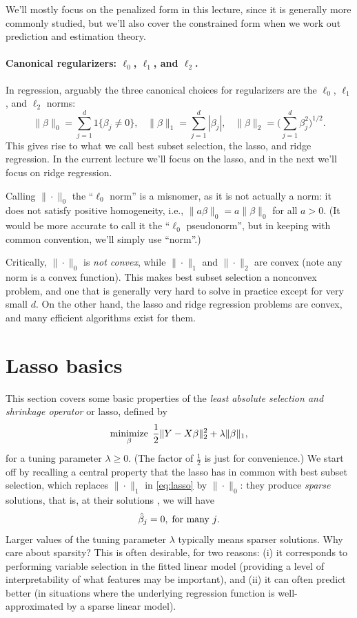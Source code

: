 \documentclass{article}
\begin{document}
We'll mostly focus on the penalized form in this lecture, since it is generally
more commonly studied, but we'll also cover the constrained form when we work
out prediction and estimation theory. 

\paragraph{Canonical regularizers: $\ell_0$, $\ell_1$, and $\ell_2$.}

In regression, arguably the three canonical choices for regularizers are the
$\ell_0$, $\ell_1$, and $\ell_2$ norms: 
\[
\|\beta\|_0 = \sum_{j=1}^d 1\{\beta_j \not= 0\}, \;\;\;
\|\beta\|_1 = \sum_{j=1}^d |\beta_j|, \;\;\;
\|\beta\|_2 = \bigg(\sum_{j=1}^d \beta_j^2 \bigg)^{1/2}.
\]
This gives rise to what we call best subset selection, the lasso, and ridge
regression. In the current lecture we'll focus on the lasso, and in the next
we'll focus on ridge regression.

Calling $\|\cdot\|_0$ the ``$\ell_0$ norm'' is a misnomer, as it is not actually
a norm: it does not satisfy positive homogeneity, i.e., $\|a\beta\|_0 =
a\|\beta\|_0$ for all $a>0$. (It would be more accurate to call it the
``$\ell_0$ pseudonorm'', but in keeping with common convention, we'll simply use
``norm''.)     

Critically, $\|\cdot\|_0$ is \emph{not convex}, while $\|\cdot\|_1$ and
$\|\cdot\|_2$ are convex (note any norm is a convex function). This makes best
subset selection a nonconvex problem, and one that is generally very hard to
solve in practice except for very small $d$. On the other hand, the lasso and
ridge regression problems are convex, and many efficient algorithms exist for
them.      

\section{Lasso basics}

This section covers some basic properties of the \emph{least absolute selection
  and shrinkage operator} or lasso, defined by   
\begin{equation}
\label{eq:lasso}
\mathop{\mathrm{minimize}}_\beta \; \frac{1}{2} \|Y - X\beta\|_2^2 + \lambda \|\beta\|_1, 
\end{equation}
for a tuning parameter $\lambda \geq 0$. (The factor of $\frac{1}{2}$ is just
for convenience.) We start off by recalling a central property that the lasso
has in common with best subset selection, which replaces $\|\cdot\|_1$ in
\eqref{eq:lasso} by  $\|\cdot\|_0$: they produce \emph{sparse} solutions, that
is, at their solutions \smash{$\hbeta$}, we will have   
\[
\hat{\beta}_j = 0, \; \text{for many $j$}.
\]
Larger values of the tuning parameter $\lambda$ typically means sparser
solutions. Why care about sparsity? This is often desirable, for two reasons:
(i) it corresponds to performing variable selection in the fitted linear model
(providing a level of interpretability of what features may be important), and
(ii) it can often predict better (in situations where the underlying regression
function is well-approximated by a sparse linear model).
\end{document}
